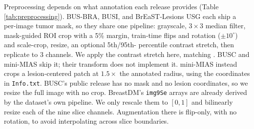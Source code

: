 \documentclass[11pt]{article}
\begin{document}
Preprocessing depends on what annotation each release provides (Table
\ref{tab:preprocessing}). BUS-BRA, BUSI, and BrEaST-Lesions USG each ship a
per-image tumor mask, so they share one pipeline: grayscale, $3\times3$
median filter, mask-guided ROI crop with a 5\% margin, train-time flips and
rotation ($\pm10^\circ$) and scale-crop, resize, an optional 5th/95th-
percentile contrast stretch, then replicate to 3 channels. We apply the
contrast stretch here, matching \citet{gomezflores2024busbra}. BUSC and
mini-MIAS skip it; their transform does not implement it. mini-MIAS instead
crops a lesion-centered patch at $1.5\times$ the annotated radius, using
the coordinates in \texttt{Info.txt}. BUSC's public release has no mask and
no lesion coordinates, so we resize the full image with no crop.
BreastDM's \texttt{img9Se} arrays are already derived by the dataset's own
pipeline. We only rescale them to $[0,1]$ and bilinearly resize each of the
nine slice channels. Augmentation there is flip-only, with no rotation, to
avoid interpolating across slice boundaries.

\begin{table}[htbp]
  \centering
  \caption{Preprocessing pipeline by dataset.}
  \label{tab:preprocessing}
\end{table}
\end{document}
